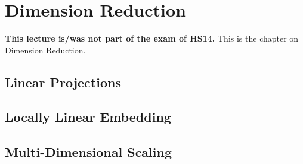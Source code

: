\documentclass[main]{subfiles}
\begin{document}

\section{Dimension Reduction}
\textbf{This lecture is/was not part of the exam of HS14.}
This is the chapter on Dimension Reduction.
\subsection{Linear Projections}
\subsection{Locally Linear Embedding}
\subsection{Multi-Dimensional Scaling}
\end{document}
